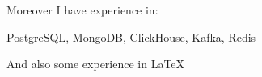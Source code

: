 Moreover I have experience in:
\begin{bulist}
  \item PostgreSQL, MongoDB, ClickHouse, Kafka, Redis
\end{bulist}
And also some experience in \LaTeX
